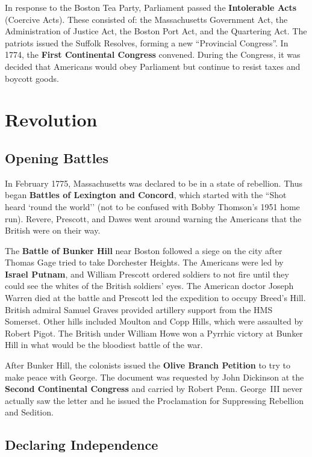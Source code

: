 In response to the Boston Tea Party, Parliament passed the \textbf{Intolerable Acts} (Coercive Acts).
These consisted of:
the Massachusetts Government Act,
the Administration of Justice Act,
the Boston Port Act,
and the Quartering Act.
The patriots issued the Suffolk Resolves, forming a new ``Provincial Congress''.
In 1774, the \textbf{First Continental Congress} convened.
During the Congress,
it was decided that Americans would obey Parliament but continue to resist taxes and boycott goods.

\section{Revolution}

\subsection*{Opening Battles}

In February 1775, Massachusetts was declared to be in a state of rebellion.
Thus began \textbf{Battles of Lexington and Concord},
which started with the ``Shot heard `round the world''
(not to be confused with Bobby Thomson's 1951 home run).
Revere, Prescott, and Dawes went around warning the Americans that the British were on their way.

The \textbf{Battle of Bunker Hill} near Boston followed a siege on the city
after Thomas Gage tried to take Dorchester Heights.
The Americans were led by \textbf{Israel Putnam},
and William Prescott ordered soldiers to not fire until they could see the whites of the British soldiers' eyes.
The American doctor Joseph Warren died at the battle
and Prescott led the expedition to occupy Breed's Hill.
British admiral Samuel Graves provided artillery support from the HMS Somerset.
Other hills included Moulton and Copp Hills, which were assaulted by Robert Pigot.
The British under William Howe won a Pyrrhic victory at Bunker Hill
in what would be the bloodiest battle of the war.

After Bunker Hill, the colonists issued the \textbf{Olive Branch Petition} to try to make peace with George.
The document was requested by John Dickinson at the \textbf{Second Continental Congress}
and carried by Robert Penn.
George~III never actually saw the letter
and he issued the Proclamation for Suppressing Rebellion and Sedition.

\subsection*{Declaring Independence}

